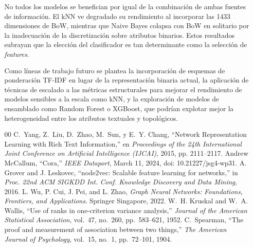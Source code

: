 \documentclass[conference,a4paper]{IEEEtran}
\begin{document}
No todos los modelos se benefician por igual de la combinación de 
ambas fuentes de información. El kNN ve degradado su rendimiento 
al incorporar las 1433 dimensiones de BoW, mientras que Naive Bayes colapsa con BoW en 
solitario por la inadecuación de la discretización sobre atributos 
binarios. Estos resultados subrayan que la elección del clasificador 
es tan determinante como la selección de \emph{features}.

Como líneas de trabajo futuro se plantea la incorporación de esquemas 
de ponderación TF-IDF en lugar de la representación binaria actual, 
la aplicación de técnicas de escalado a las métricas estructurales 
para mejorar el rendimiento de modelos sensibles a la escala como 
kNN, y la exploración de modelos de ensamblado como Random Forest o 
XGBoost, que podrían explotar mejor la heterogeneidad entre los 
atributos textuales y topológicos.

\begin{thebibliography}{00}
C.~Yang, Z.~Liu, D.~Zhao, M.~Sun, y E.~Y. Chang, 
``Network Representation Learning with Rich Text Information,'' 
en \emph{Proceedings of the 24th International Joint Conference on Artificial Intelligence (IJCAI)}, 
2015, pp. 2111--2117.
 Andrew McCallum, ``Cora,'' \emph{IEEE Dataport}, March 11, 2024, doi: 10.21227/jsg4-wp31.
A. Grover and J. Leskovec, ``node2vec: Scalable feature learning for 
networks,'' in \emph{Proc. 22nd ACM SIGKDD Int. Conf. Knowledge 
Discovery and Data Mining}, 2016.
L. Wu, P. Cui, J. Pei, and L. Zhao, \emph{Graph Neural Networks: 
Foundations, Frontiers, and Applications}. Springer Singapore, 2022.
W.~H. Kruskal and W.~A. Wallis, ``Use of ranks in one-criterion 
variance analysis,'' \emph{Journal of the American Statistical 
Association}, vol.~47, no.~260, pp.~583--621, 1952.
C.~Spearman, ``The proof and measurement of association between 
two things,'' \emph{The American Journal of Psychology}, vol.~15, 
no.~1, pp.~72--101, 1904.

\end{thebibliography}
\end{document}
